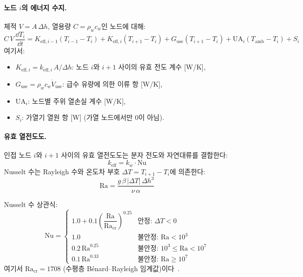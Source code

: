 \paragraph{노드 $i$의 에너지 수지.}
체적 $V = A\,\Delta h$, 열용량 $C = \rho_w c_w$인 노드에 대해:
\begin{equation}\label{eq:tank-energy}
  C\,V\,\frac{\dd T_i}{\dd t}
  = K_{\text{eff},i-1}(T_{i-1} - T_i)
  + K_{\text{eff},i}(T_{i+1} - T_i)
  + G_\text{use}(T_{i+1} - T_i)
  + \text{UA}_i(T_\text{amb} - T_i)
  + S_i
\end{equation}
여기서:
\begin{itemize}
  \item $K_{\text{eff},i} = k_{\text{eff},i}\,A / \Delta h$: 노드 $i$와 $i+1$ 사이의 유효 전도 계수 [W/K],
  \item $G_\text{use} = \rho_w c_w \dot{V}_\text{use}$: 급수 유량에 의한 이류 항 [W/K],
  \item $\text{UA}_i$: 노드별 주위 열손실 계수 [W/K],
  \item $S_i$: 가열기 열원 항 [W] (가열 노드에서만 0이 아님).
\end{itemize}

\paragraph{유효 열전도도.}
인접 노드 $i$와 $i+1$ 사이의 유효 열전도도는 분자 전도와 자연대류를 결합한다:
\begin{equation}\label{eq:tank-keff}
  k_{\text{eff}} = k_w \cdot \text{Nu}
\end{equation}
Nusselt 수는 Rayleigh 수와 온도차 부호 $\Delta T = T_{i+1} - T_i$에 의존한다:
\begin{equation}\label{eq:tank-Ra}
  \text{Ra} = \frac{g\,\beta\,|\Delta T|\,\Delta h^3}{\nu\,\alpha}
\end{equation}

Nusselt 수 상관식:
\begin{equation}\label{eq:tank-Nu}
  \text{Nu} = \begin{cases}
    1.0 + 0.1\left(\dfrac{\text{Ra}}{\text{Ra}_\text{cr}}\right)^{0.25}
      & \text{안정: } \Delta T < 0 \\[8pt]
    1.0   & \text{불안정: } \text{Ra} < 10^3 \\
    0.2\,\text{Ra}^{0.25} & \text{불안정: } 10^3 \le \text{Ra} < 10^7 \\
    0.1\,\text{Ra}^{0.33} & \text{불안정: } \text{Ra} \ge 10^7
  \end{cases}
\end{equation}
여기서 $\text{Ra}_\text{cr} = 1708$ (수평층 B\'{e}nard--Rayleigh 임계값)이다~\cite{incropera2006}.

